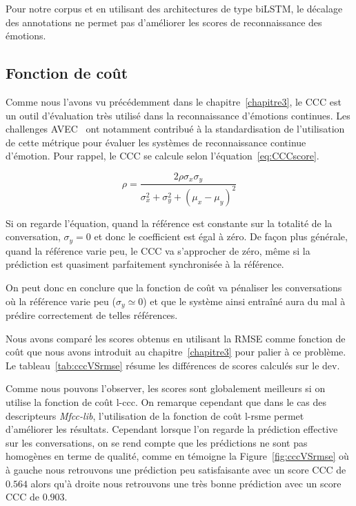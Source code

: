Pour notre corpus et en utilisant des architectures de type biLSTM, le décalage des annotations ne permet pas d'améliorer les scores de reconnaissance des émotions.

\subsection{Fonction de coût}
Comme nous l'avons vu précédemment dans le chapitre~\ref{chapitre3}, le CCC est un outil d'évaluation très utilisé dans la reconnaissance d'émotions continues. Les challenges AVEC~\cite{AVEC2018} ont notamment contribué à la standardisation de l'utilisation de cette métrique pour évaluer les systèmes de reconnaissance continue d'émotion. Pour rappel, le CCC se calcule selon l'équation~\ref{eq:CCCscore}.

\begin{equation}
   \rho = \frac{2\rho\sigma_x\sigma_y}{\sigma_x^2 + \sigma_y^2 + (\mu_x - \mu_y)^2}
\label{eq:CCCscore}
\end{equation}

Si on regarde l'équation, quand la référence est constante sur la totalité de la conversation, $\sigma_y = 0$ et donc le coefficient est égal à zéro. De façon plus générale, quand la référence varie peu, le CCC va s'approcher de zéro, même si la prédiction est quasiment parfaitement synchronisée à la référence.

On peut donc en conclure que la fonction de coût va pénaliser les conversations où la référence varie peu ($\sigma_y \simeq 0$) et que le système ainsi entraîné aura du mal à prédire correctement de telles références.



Nous avons comparé les scores obtenus en utilisant la RMSE comme fonction de coût que nous avons introduit au chapitre~\ref{chapitre3} pour palier à ce problème. Le tableau~\ref{tab:cccVSrmse} résume les différences de scores calculés sur le dev.

Comme nous pouvons l'observer, les scores sont globalement meilleurs si on utilise la fonction de coût l-ccc. On remarque cependant que dans le cas des descripteurs \textit{Mfcc-lib}, l'utilisation de la fonction de coût l-rsme permet d'améliorer les résultats. Cependant lorsque l'on regarde la prédiction effective sur les conversations, on se rend compte que les prédictions ne sont pas homogènes en terme de qualité, comme en témoigne la Figure~\ref{fig:cccVSrmse} où à gauche nous retrouvons une prédiction peu satisfaisante avec un score CCC de $0.564$ alors qu'à droite nous retrouvons une très bonne prédiction avec un score CCC de $0.903$.

